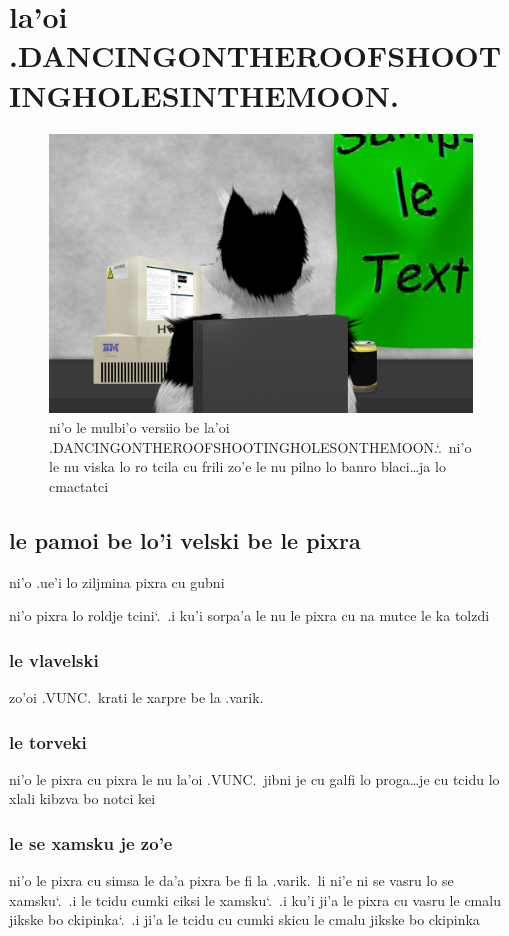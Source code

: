 \documentclass{report}
\newcommand\sds{\spacefactor\sfcode`.\ \space}
\begin{document}
\chapter{la'oi .DANCINGONTHEROOFSHOOTINGHOLESINTHEMOON.}
\begin{figure}[ht]
	\centering
	\includegraphics[width=\textwidth]{dancingontheroofshootingholesinthemoon/dancingontheroofshootingholesinthemoon.png}
	\caption[center]{ni'o le mulbi'o versiio be la'oi .DANCINGONTHEROOFSHOOTINGHOLESONTHEMOON.\sds  ni'o le nu viska lo ro tcila cu frili zo'e le nu pilno lo banro blaci\ldots ja lo cmactatci}
\end{figure}
\section{le pamoi be lo'i velski be le pixra}
ni'o .ue'i lo ziljmina pixra cu gubni

ni'o pixra lo roldje tcini\sds  .i ku'i sorpa'a le nu le pixra cu na mutce le ka tolzdi

\subsection{le vlavelski}
zo'oi .VUNC.\ krati le xarpre be la .varik.
\subsection{le torveki}
ni'o le pixra cu pixra le nu la'oi .VUNC.\ jibni je cu galfi lo proga\ldots je cu tcidu lo xlali kibzva bo notci kei

\subsection{le se xamsku je zo'e}
ni'o le pixra cu simsa le da'a pixra be fi la .varik.\ li ni'e ni se vasru lo se xamsku\sds  .i le tcidu cumki ciksi le xamsku\sds  .i ku'i ji'a le pixra cu vasru le cmalu jikske bo ckipinka\sds  .i ji'a le tcidu cu cumki skicu le cmalu jikske bo ckipinka
\end{document}
